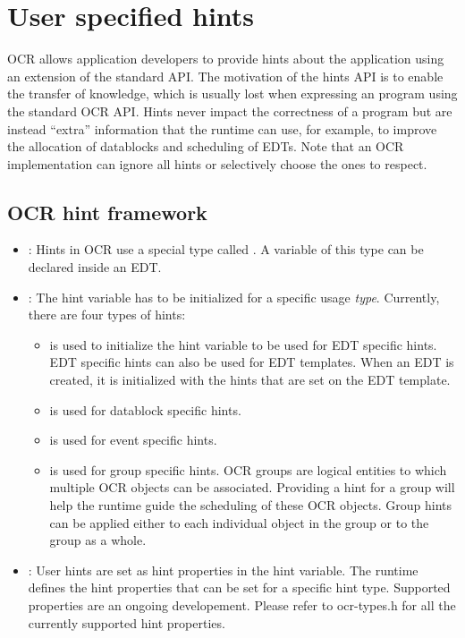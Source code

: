 \section{User specified hints}
OCR allows application developers to provide hints about the application using
an extension of the standard API. The motivation of the hints API is to enable
the transfer of knowledge, which is usually lost when expressing an program
using the standard OCR API. Hints never impact the correctness of a program but
are instead “extra” information that the runtime can use, for example, to
improve the allocation of datablocks and scheduling of EDTs. Note that an OCR
implementation can ignore all hints or selectively choose the ones to respect.

\subsection{OCR hint framework}
\begin{itemize}
\item \hypertarget{type_ocrHint_t}{}: Hints in OCR use a special
type called . A variable of this type can be declared inside an EDT.

\item \hypertarget{type_ocrHintType_t}{}: The hint variable
has to be initialized for a specific usage {\em type}. Currently, there are four
types of hints:
\begin{itemize}
\item {} is used to initialize the hint variable to be
used for EDT specific hints. EDT specific hints can also be used for EDT
templates. When an EDT is created, it is initialized with the hints that are
set on the EDT template.
\item {} is used for datablock specific hints.
\item {} is used for event specific hints.
\item {} is used for group specific hints.
OCR groups are logical entities to which multiple OCR objects can be associated.
Providing a hint for a group will help the runtime guide the scheduling of these
OCR objects. Group hints can be applied either to each individual object in the
group or to the group as a whole.
\end{itemize}

\item \hypertarget{type_ocrHintProp_t}{}: User hints are
set as hint properties in the hint variable. The runtime defines the hint
properties that can be set for a specific hint type. Supported properties are
an ongoing developement. Please refer to ocr-types.h for all the currently
supported hint properties.
\end{itemize}


